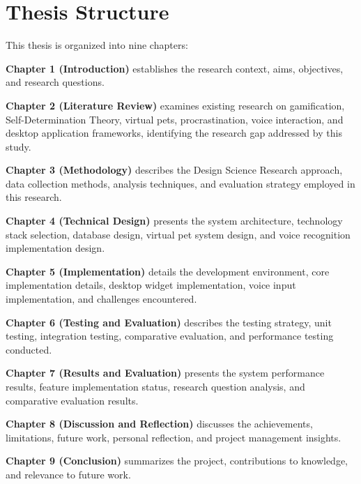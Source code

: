 \section{Thesis Structure}
\label{sec:structure}

This thesis is organized into nine chapters:

\textbf{Chapter 1 (Introduction)} establishes the research context, aims, objectives, and research questions.

\textbf{Chapter 2 (Literature Review)} examines existing research on gamification, Self-Determination Theory, virtual pets, procrastination, voice interaction, and desktop application frameworks, identifying the research gap addressed by this study.

\textbf{Chapter 3 (Methodology)} describes the Design Science Research approach, data collection methods, analysis techniques, and evaluation strategy employed in this research.

\textbf{Chapter 4 (Technical Design)} presents the system architecture, technology stack selection, database design, virtual pet system design, and voice recognition implementation design.

\textbf{Chapter 5 (Implementation)} details the development environment, core implementation details, desktop widget implementation, voice input implementation, and challenges encountered.

\textbf{Chapter 6 (Testing and Evaluation)} describes the testing strategy, unit testing, integration testing, comparative evaluation, and performance testing conducted.

\textbf{Chapter 7 (Results and Evaluation)} presents the system performance results, feature implementation status, research question analysis, and comparative evaluation results.

\textbf{Chapter 8 (Discussion and Reflection)} discusses the achievements, limitations, future work, personal reflection, and project management insights.

\textbf{Chapter 9 (Conclusion)} summarizes the project, contributions to knowledge, and relevance to future work.
